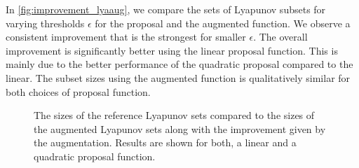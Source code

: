 In \autoref{fig:improvement_lyaaug}, we compare the sets of Lyapunov
subsets for varying thresholds $\epsilon$ for the proposal and the
augmented function.
We observe a consistent improvement that is the strongest for smaller
$\epsilon$.
The overall improvement is significantly better using the linear
proposal function.
This is mainly due to the better performance of the quadratic
proposal compared to the linear.
The subset sizes using the augmented function is qualitatively
similar for both choices of proposal function.
\begin{figure}[htb]
  \centering
  \caption[Subset sizes using
  Lyapunov-Augmentation]{\label{fig:improvement_lyaaug}The sizes of
    the reference Lyapunov sets compared to the sizes of the augmented
    Lyapunov sets along with the improvement given by the augmentation.
  Results are shown for both, a linear and a quadratic proposal function.}
\end{figure}

